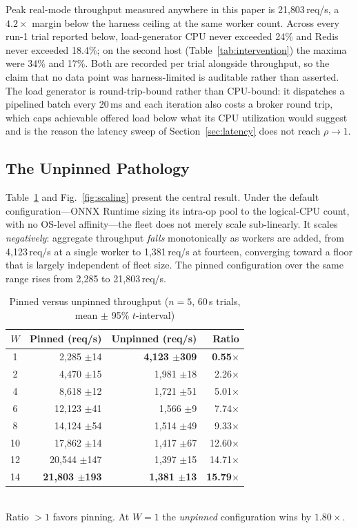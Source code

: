 \documentclass[conference]{IEEEtran}
\begin{document}
Peak real-mode throughput measured anywhere in this paper is 21{,}803\,req/s, a $4.2\times$ margin below the harness ceiling at the same worker count. Across every run-1 trial reported below, load-generator CPU never exceeded 24\% and Redis never exceeded 18.4\%; on the second host (Table~\ref{tab:intervention}) the maxima were 34\% and 17\%. Both are recorded per trial alongside throughput, so the claim that no data point was harness-limited is auditable rather than asserted. The load generator is round-trip-bound rather than CPU-bound: it dispatches a pipelined batch every 20\,ms and each iteration also costs a broker round trip, which caps achievable offered load below what its CPU utilization would suggest and is the reason the latency sweep of Section~\ref{sec:latency} does not reach $\rho \to 1$.

\subsection{The Unpinned Pathology}
\label{sec:unpinned}

Table~\ref{tab:pinunpin} and Fig.~\ref{fig:scaling} present the central result. Under the default configuration---ONNX Runtime sizing its intra-op pool to the logical-CPU count, with no OS-level affinity---the fleet does not merely scale sub-linearly. It scales \emph{negatively}: aggregate throughput \emph{falls} monotonically as workers are added, from 4{,}123\,req/s at a single worker to 1{,}381\,req/s at fourteen, converging toward a floor that is largely independent of fleet size. The pinned configuration over the same range rises from 2{,}285 to 21{,}803\,req/s.

\begin{table}[t]
\caption{Pinned versus unpinned throughput ($n{=}5$, 60\,s trials, mean $\pm$ 95\% $t$-interval)}
\label{tab:pinunpin}
\centering\small\setlength{\tabcolsep}{3pt}
\begin{tabular}{@{}crrr@{}}
\toprule
$W$ & Pinned (req/s) & Unpinned (req/s) & Ratio \\
\midrule
1  & 2{,}285 $\pm$14  & \textbf{4{,}123 $\pm$309} & \textbf{0.55}$\times$ \\
2  & 4{,}470 $\pm$15  & 1{,}981 $\pm$18  & 2.26$\times$ \\
4  & 8{,}618 $\pm$12  & 1{,}721 $\pm$51  & 5.01$\times$ \\
6  & 12{,}123 $\pm$41 & 1{,}566 $\pm$9   & 7.74$\times$ \\
8  & 14{,}124 $\pm$54 & 1{,}514 $\pm$49  & 9.33$\times$ \\
10 & 17{,}862 $\pm$14 & 1{,}417 $\pm$67  & 12.60$\times$ \\
12 & 20{,}544 $\pm$147& 1{,}397 $\pm$15  & 14.71$\times$ \\
14 & \textbf{21{,}803 $\pm$193} & \textbf{1{,}381 $\pm$13} & \textbf{15.79}$\times$ \\
\bottomrule
\end{tabular}
\\[2pt]\footnotesize Ratio $>1$ favors pinning. At $W{=}1$ the \emph{unpinned}
configuration wins by $1.80\times$.
\end{table}
\end{document}
